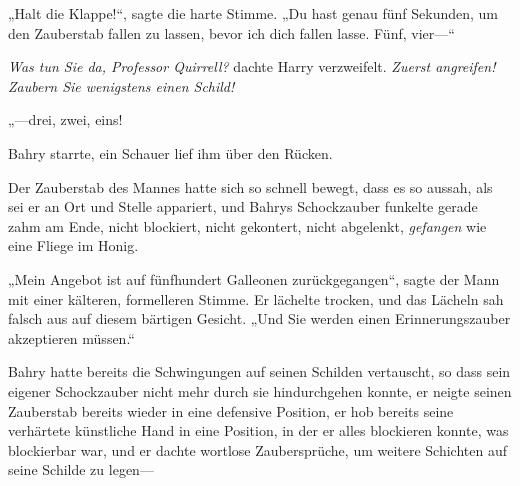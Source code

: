 „Halt die Klappe!“, sagte die harte Stimme. „Du hast genau fünf Sekunden, um den Zauberstab fallen zu lassen, bevor ich dich fallen lasse. Fünf, vier—“

\emph{Was tun Sie da, Professor Quirrell?} dachte Harry verzweifelt. \emph{Zuerst angreifen! Zaubern Sie wenigstens einen Schild!}

„—drei, zwei, eins! 

\later

Bahry starrte, ein Schauer lief ihm über den Rücken.

Der Zauberstab des Mannes hatte sich so schnell bewegt, dass es so aussah, als sei er an Ort und Stelle appariert, und Bahrys Schockzauber funkelte gerade zahm am Ende, nicht blockiert, nicht gekontert, nicht abgelenkt, \emph{gefangen} wie eine Fliege im Honig.

„Mein Angebot ist auf fünfhundert Galleonen zurückgegangen“, sagte der Mann mit einer kälteren, formelleren Stimme. Er lächelte trocken, und das Lächeln sah falsch aus auf diesem bärtigen Gesicht. „Und Sie werden einen Erinnerungszauber akzeptieren müssen.“

Bahry hatte bereits die Schwingungen auf seinen Schilden vertauscht, so dass sein eigener Schockzauber nicht mehr durch sie hindurchgehen konnte, er neigte seinen Zauberstab bereits wieder in eine defensive Position, er hob bereits seine verhärtete künstliche Hand in eine Position, in der er alles blockieren konnte, was blockierbar war, und er dachte wortlose Zaubersprüche, um weitere Schichten auf seine Schilde zu legen—

